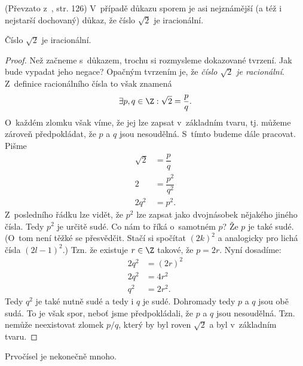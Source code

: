 (Převzato z~\cite{ChartrandPolimeniZhang2014}, str. 126)
V~případě důkazu sporem je asi nejznámější (a též i nejstarší dochovaný) důkaz, že číslo $\sqrt{2}$ je iracionální.
\begin{proposition}
    Číslo $\sqrt{2}$ je iracionální.
\end{proposition}
\begin{proof}
    Než začneme s~důkazem, trochu si rozmysleme dokazované tvrzení. Jak bude vypadat jeho negace? Opačným tvrzením je, že \emph{číslo $\sqrt{2}$ je racionální}. Z~definice racionálního čísla to však znamená
    \begin{equation*}
        \exists p,q\in\Z : \sqrt{2}=\dfrac{p}{q}.
    \end{equation*}
    O~každém zlomku však víme, že jej lze zapsat v~základním tvaru, tj. můžeme zároveň předpokládat, že $p$ a $q$ jsou nesoudělná. S~tímto budeme dále pracovat. Pišme
    \begin{align*}
        \sqrt{2}&=\dfrac{p}{q}\\
        2&=\dfrac{p^2}{q^2}\\
        2q^2&=p^2.
    \end{align*}
    Z~posledního řádku lze vidět, že $p^2$ lze zapsat jako dvojnásobek nějakého jiného čísla. Tedy $p^2$ je určitě sudé. Co nám to říká o~samotném $p$? Že $p$ je také sudé. (O~tom není těžké se přesvědčit. Stačí si spočítat $(2k)^2$ a analogicky pro lichá čísla $(2l-1)^2$.) Tzn. že existuje $r\in\Z$ takové, že $p=2r$. Nyní dosadíme:
    \begin{align*}
        2q^2&=(2r)^2\\
        2q^2&=4r^2\\
        q^2&=2r^2.
    \end{align*}
    Tedy $q^2$ je také nutně sudé a tedy i $q$ je sudé. Dohromady tedy $p$ a $q$ jsou obě sudá. To je však spor, neboť jsme předpokládali, že $p$ a $q$ jsou nesoudělná. Tzn. nemůže neexistovat zlomek $p/q$, který by byl roven $\sqrt{2}$ a byl v~základním tvaru.
\end{proof}
\begin{proposition}\label{prop:prvocisla}
    Prvočísel je nekonečně mnoho.
\end{proposition}
